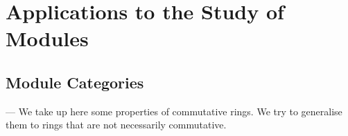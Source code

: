 %
%
%

\chapter{Applications to the Study of Modules}

\section{Module Categories}

\newtheorem*{propbis}{Proposition 1 bis}

--- We take up here some properties of commutative rings.  We try to
generalise them to rings that are not necessarily commutative.

